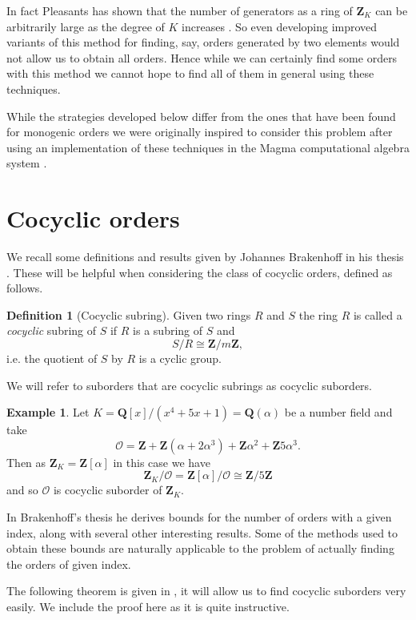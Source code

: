 \documentclass[12pt,a4paper,abstracton,bibtotoc]{scrreprt}
\theoremstyle{definition}
\newtheorem{defn}{Definition}
\newtheorem{ex}{Example}
\newcommand{\QQ}{\mathbf{Q}}
\newcommand{\ZZ}{\mathbf{Z}}
\renewcommand{\O}{\mathcal{O}}
\begin{document}
In fact Pleasants has shown that the number of generators as a ring of $\ZZ_K$ can be arbitrarily large as the degree of $K$ increases \cite{pleasants}.
So even developing improved variants of this method for finding, say, orders generated by two elements would not allow us to obtain all orders.
Hence while we can certainly find some orders with this method we cannot hope to find all of them in general using these techniques.

While the strategies developed below differ from the ones that have been found for monogenic orders we were originally inspired to consider this problem after using an implementation of these techniques in the Magma computational algebra system \cite{magma}.


\section{Cocyclic orders}
\label{sec:cocyc}
We recall some definitions and results given by Johannes Brakenhoff in his thesis \cite{brakenhoff}.
These will be helpful when considering the class of cocyclic orders, defined as follows.

\begin{defn}[Cocyclic subring]
Given two rings $R$ and $S$ the ring $R$ is called a \emph{cocyclic} subring of $S$ if $R$ is a subring of $S$ and
\[
S/R \cong \ZZ/m\ZZ,
\]
i.e. the quotient of $S$ by $R$ is a cyclic group.
\end{defn}

We will refer to suborders that are cocyclic subrings as cocyclic suborders.

\begin{ex}
\label{ex:cocyc}
Let $K = \QQ[x]/(x^4 + 5x + 1) = \QQ(\alpha)$ be a number field and take
\[
\O = \ZZ + \ZZ(\alpha + 2\alpha^3) + \ZZ\alpha^2 + \ZZ5\alpha^3.
\]
Then as $\ZZ_K = \ZZ[\alpha]$ in this case we have
\[
\ZZ_K/\O = \ZZ[\alpha]/\O \cong \ZZ/5\ZZ
\]
and so $\O$ is cocyclic suborder of $\ZZ_K$.
\end{ex}

In Brakenhoff's thesis he derives bounds for the number of orders with a given index, along with several other interesting results.
Some of the methods used to obtain these bounds are naturally applicable to the problem of actually finding the orders of given index.

The following theorem is given in \cite[Thm. 4.1]{brakenhoff}, it will allow us to find cocyclic suborders very easily.
We include the proof here as it is quite instructive.
\end{document}

